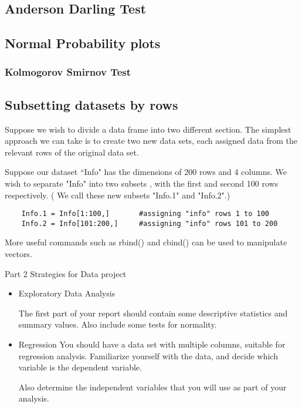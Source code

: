 \documentclass[a4paper,12pt]{article}
\begin{document}
\begin{itemize}
	\subsection{Anderson Darling Test}
	\subsection{Normal Probability plots}
	\subsubsection{ Kolmogorov Smirnov Test}
	
	
	
	
	
	
	\subsection{Subsetting datasets by rows}
	
	Suppose we wish to divide a data frame into two different section. The simplest approach we can take is to create two new data sets, each assigned data from the relevant rows of the original data set.
	
	Suppose our dataset ``Info" has the dimensions of 200 rows and 4 columns. We wish to separate "Info" into two subsets , with the first and second 100 rows respectively. ( We call these new subsets "Info.1" and "Info.2".)
	\begin{verbatim}
	Info.1 = Info[1:100,]		#assigning "info" rows 1 to 100
	Info.2 = Info[101:200,]		#assigning "info" rows 101 to 200
	\end{verbatim}
	
	More useful commands such as rbind() and cbind()  can be used to manipulate vectors.
	
	Part 2 Strategies for Data project
	\begin{itemize}
		\item Exploratory Data Analysis
		
		The first part of your report should contain some descriptive statistics and summary values. Also include some tests for normality.
		
		\item{Regression}
		You should have a data set with multiple columns, suitable for regression analysis.
		Familiarize yourself with the data, and decide which variable is the dependent variable.
		
		Also determine the independent variables that you will use as part of your analysis.
		

\end{itemize}
\end{itemize}
\end{document}

